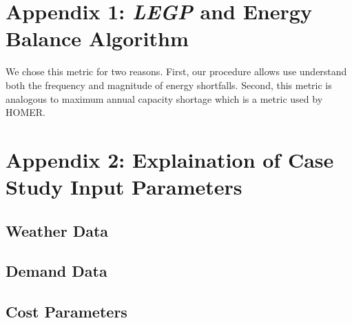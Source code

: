 \documentclass[11p]{article}
\begin{document}
\appendix	
\section{Appendix 1: \emph{LEGP} and Energy Balance Algorithm} \label{A1}

We chose this metric for two reasons.
First, our procedure allows use understand both the frequency and magnitude of energy shortfalls. 
Second, this metric is analogous to maximum annual capacity shortage which is a metric used by HOMER.


\section{Appendix 2: Explaination of Case Study Input Parameters} \label{A2}

\subsection{Weather Data}
\subsection{Demand Data}
\subsection{Cost Parameters}
\end{document}

